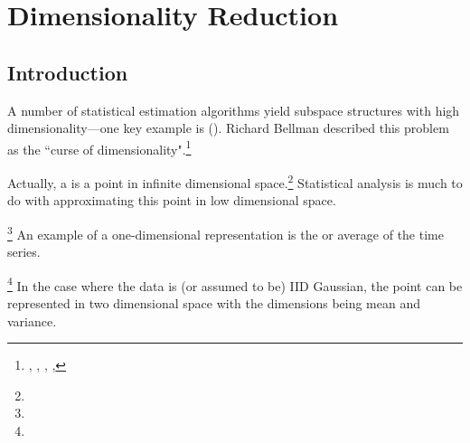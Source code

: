 \chapter{Dimensionality Reduction}
\label{chp:dimreduct}
\section{Introduction}
A number of statistical estimation algorithms yield subspace structures with 
high dimensionality---one key example is  ().
Richard Bellman described this problem as the 
``curse of dimensionality".\footnote{
  ,
  ,
  ,
  ,
  }

Actually, a  is a point in infinite dimensional space.\footnote{
  }
Statistical analysis is much to do with approximating this point in low dimensional space.

\begin{example}
\footnote{
  }
An example of a one-dimensional representation is the  or average of the time series.
\end{example}

\begin{example}
\footnote{
  }
In the case where the data is (or assumed to be) IID Gaussian, the point can be represented in 
two dimensional space with the dimensions being mean and variance.
\end{example}

